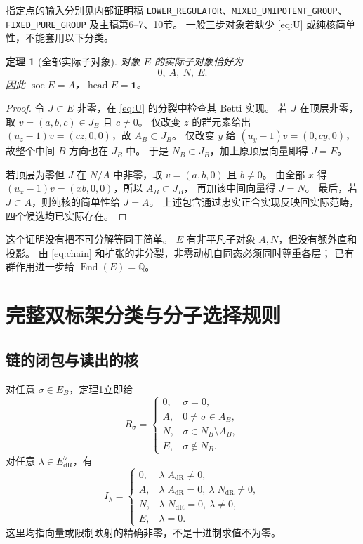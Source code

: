 \documentclass[11pt,a4paper]{ctexart}
\theoremstyle{cnplain}
\newtheorem{theorem}{定理}[section]
\theoremstyle{definition}
\theoremstyle{remark}
\newcommand{\Q}{\mathbb Q}
\newcommand{\dR}{\mathrm{dR}}
\newcommand{\End}{\operatorname{End}}
\newcommand{\soc}{\operatorname{soc}}
\newcommand{\head}{\operatorname{head}}
\begin{document}
指定点的输入分别见内部证明稿
\nolinkurl{LOWER_REGULATOR}、\nolinkurl{MIXED_UNIPOTENT_GROUP}、
\nolinkurl{FIXED_PURE_GROUP} 及主稿第6--7、10节。
一般三步对象若缺少 \eqref{eq:U} 或纯核简单性，不能套用以下分类。

\begin{theorem}[全部实际子对象]\label{thm:uniserial}
对象 $E$ 的实际子对象恰好为
\begin{equation}\label{eq:chain}
                        0,\ A,\ N,\ E.
\end{equation}
因此 $\soc E=A$，$\head E=\mathbf1$。
\end{theorem}
\begin{proof}
令 $J\subset E$ 非零，在 \eqref{eq:U} 的分裂中检查其 Betti 实现。
若 $J$ 在顶层非零，取 $v=(a,b,c)\in J_B$ 且 $c\ne0$。
仅改变 $z$ 的群元素给出 $(u_z-1)v=(cz,0,0)$，故 $A_B\subset J_B$。
仅改变 $y$ 给 $(u_y-1)v=(0,cy,0)$，故整个中间 $B$ 方向也在 $J_B$ 中。
于是 $N_B\subset J_B$，加上原顶层向量即得 $J=E$。

若顶层为零但 $J$ 在 $N/A$ 中非零，取 $v=(a,b,0)$ 且 $b\ne0$。
由全部 $x$ 得 $(u_x-1)v=(xb,0,0)$，所以 $A_B\subset J_B$，
再加该中间向量得 $J=N$。
最后，若 $J\subset A$，则纯核的简单性给 $J=A$。
上述包含通过忠实正合实现反映回实际范畴，四个候选均已实际存在。
\end{proof}

这个证明没有把不可分解等同于简单。
$E$ 有非平凡子对象 $A,N$，但没有额外直和投影。
由 \eqref{eq:chain} 和扩张的非分裂，非零动机自同态必须同时尊重各层；
已有群作用进一步给 $\End(E)=\Q$。

\section{完整双标架分类与分子选择规则}
\subsection{链的闭包与读出的核}
对任意 $\sigma\in E_B$，定理\ref{thm:uniserial}立即给
\begin{equation}\label{eq:Rlevels}
 R_\sigma=
 \begin{cases}
 0,&\sigma=0,\\
 A,&0\ne\sigma\in A_B,\\
 N,&\sigma\in N_B\setminus A_B,\\
 E,&\sigma\notin N_B.
 \end{cases}
\end{equation}
对任意 $\lambda\in E_{\dR}^{\vee}$，有
\begin{equation}\label{eq:Ilevels}
 I_\lambda=
 \begin{cases}
 0,&\lambda|A_{\dR}\ne0,\\
 A,&\lambda|A_{\dR}=0,\ \lambda|N_{\dR}\ne0,\\
 N,&\lambda|N_{\dR}=0,\ \lambda\ne0,\\
 E,&\lambda=0.
 \end{cases}
\end{equation}
这里均指向量或限制映射的精确非零，不是十进制求值不为零。
\end{document}
